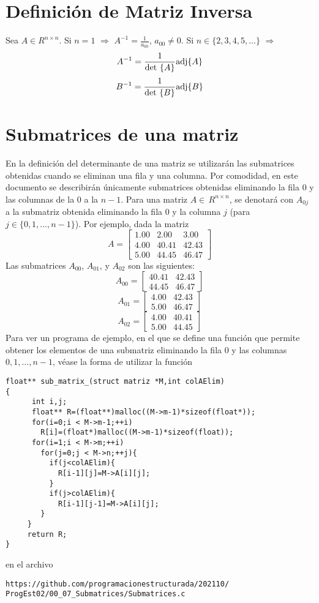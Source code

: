 \documentclass{article}
\def\InvDA{
$A^{-1}=\frac{1}{\mbox{\rm det\ }\{A\}}\mbox{\rm adj}\{A\}$
}
\def\InvD#1{
#1^{-1}=\frac{1}{\mbox{\rm det\ }\{#1\}}\mbox{\rm adj}\{#1\}
}
\begin{document}
\section{Def\/inici\'on de Matriz Inversa}
Sea $A\in R^{n\times n}$. Si $n=1$ $\Rightarrow$ 
$A^{-1}=\frac{1}{a_{00}}$, $a_{00}\neq 0$. Si $n\in\{2,3,4,5,\ldots\}$
$\Rightarrow$ 
\[
A^{-1}=\frac{1}
{\mbox{\rm det\ }\{A\}}\mbox{\rm adj}\{A\}
\]
\[
\InvD{B}
\]
\section{Submatrices de una matriz}
En la definici\'{o}n del determinante de una matriz se utilizar\'{a}n las submatrices 
obtenidas cuando se eliminan una fila y una columna. Por comodidad, en este documento 
se describir\'{a}n \'{u}nicamente submatrices obtenidas eliminando la fila 0 y las 
columnas de la 0 a la $n-1$. Para una matriz $A\in\,R^{n\times n}$, se denotar\'{a} con 
$A_{0j}$ a la submatriz obtenida eliminando la  fila 0 y la columna  $j$ (para 
$j\in\{0,1,\ldots,n-1\}$). Por ejemplo, dada la matriz
\[
A = \left[\begin{array}{ccc}
1.00&2.00&3.00\\
4.00&40.41&42.43\\
5.00&44.45&46.47
\end{array}\right]
\]
Las submatrices $A_{00}$, $A_{01}$, y $A_{02}$ son las siguientes:
\[
A_{00} =  
\left[\begin{array}{cc}
40.41&42.43\\
44.45&46.47
\end{array}\right]
\]
\[
A_{01} =  
\left[\begin{array}{cc}
4.00&42.43\\
5.00&46.47
\end{array}\right]
\]
\[
A_{02} =  
\left[\begin{array}{cc}
4.00&40.41\\
5.00&44.45
\end{array}\right]
\]
Para ver un programa de ejemplo, en el que se def\/ine una funci\'{o}n que permite 
obtener los  elementos de una submatriz eliminando la fila 0 y las columnas 
$0,1,\ldots,n-1$, v\'{e}ase la forma de utilizar la funci\'{o}n 
\begin{verbatim} 
float** sub_matrix_(struct matriz *M,int colAElim)
{
      int i,j;
      float** R=(float**)malloc((M->m-1)*sizeof(float*));
      for(i=0;i < M->m-1;++i)
        R[i]=(float*)malloc((M->m-1)*sizeof(float));
      for(i=1;i < M->m;++i)
        for(j=0;j < M->n;++j){
          if(j<colAElim){
            R[i-1][j]=M->A[i][j];
          }
          if(j>colAElim){
            R[i-1][j-1]=M->A[i][j];
        }
     }
     return R;
}
\end{verbatim}
en el archivo 
\begin{verbatim}
https://github.com/programacionestructurada/202110/
ProgEst02/00_07_Submatrices/Submatrices.c
\end{verbatim}
\end{document}
